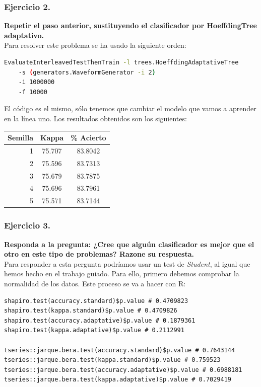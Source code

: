 \documentclass[11pt]{article}
\begin{document}
\subsubsection{Ejercicio 2.}

\textbf{Repetir el paso anterior, sustituyendo el clasificador por HoeffdingTree adaptativo.} \\

Para resolver este problema se ha usado la siguiente orden:

\begin{lstlisting}[language=bash]
EvaluateInterleavedTestThenTrain -l trees.HoeffdingAdaptativeTree
	-s (generators.WaveformGenerator -i 2)
	-i 1000000
	-f 10000
\end{lstlisting}

El código es el mismo, sólo tenemos que cambiar el modelo que vamos a aprender en la línea uno. Los resultados obtenidos son los siguientes:

\begin{table}[H]
	\centering
	\begin{tabular}{rcc}
		\textbf{Semilla} & \textbf{Kappa} & \textbf{\% Acierto} \\ \hline
		1 & 75.707 & 83.8042 \\
		2 & 75.596 & 83.7313 \\
		3 & 75.679 & 83.7875 \\
		4 & 75.696 & 83.7961 \\
		5 & 75.571 & 83.7144
	\end{tabular}
\end{table}

\subsubsection{Ejercicio 3.}

\textbf{Responda a la pregunta: ¿Cree que alguún clasificador es mejor que el otro en este tipo de problemas? Razone su respuesta.} \\

Para responder a esta pergunta podríamos usar un test de \textit{Student}, al igual que hemos hecho en el trabajo guiado. Para ello, primero debemos comprobar la normalidad de los datos. Este proceso se va a hacer con R:

\begin{lstlisting}
shapiro.test(accuracy.standard)$p.value # 0.4709823
shapiro.test(kappa.standard)$p.value # 0.4709826
shapiro.test(accuracy.adaptative)$p.value # 0.1879361
shapiro.test(kappa.adaptative)$p.value # 0.2112991

tseries::jarque.bera.test(accuracy.standard)$p.value # 0.7643144
tseries::jarque.bera.test(kappa.standard)$p.value # 0.759523
tseries::jarque.bera.test(accuracy.adaptative)$p.value # 0.6988181
tseries::jarque.bera.test(kappa.adaptative)$p.value # 0.7029419
\end{lstlisting}
\end{document}
